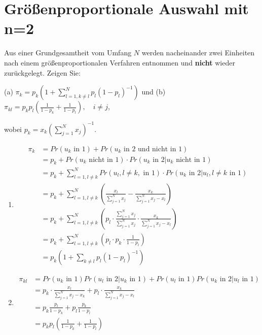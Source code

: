 \documentclass{article}
\begin{document}
\section{Größenproportionale Auswahl mit n=2}
Aus einer Grundgesamtheit vom Umfang $N$ werden nacheinander zwei Einheiten nach einem größenproportionalen Verfahren entnommen
und \textbf{nicht} wieder zurückgelegt. Zeigen Sie:
\begin{center}
(a) $\pi_k = p_k \left(1 + \sum_{l=1,k\neq l}^N p_l (1 - p_l)^{-1}  \right)$ und 
(b) $\pi_{kl} = p_k p_l  \left(\frac{1}{1 - p_k} + \frac{1}{1 - p_l}  \right), \quad i \neq j$,\end{center} wobei $p_k = x_k \left(\sum_{j=1}^N x_j \right)^{-1}$.
\begin{solution}
\begin{enumerate}
	\item \begin{align*}
	\pi_k &=Pr(u_k \text{ in } 1) + Pr(u_k \text{ in 2 und nicht in }1) \\
	&= p_k +Pr(u_k \text{ nicht in 1})\cdot Pr(u_k \text{ in 2}|u_k \text{ nicht in 1})\\
	&=p_k + \sum_{l=1,l \neq k}^N Pr(u_l, l\neq k, \text{ in 1}) \cdot Pr(u_k \text{ in 2}|u_l, l \neq k \text{ in 1})\\
	&=p_k + \sum_{l=1,l\neq k}^N\left(\frac{x_l}{\sum_{j=1}^N x_j} - \frac{x_k}{\sum_{j=1}^N x_j-x_l}\right)\\
	&=p_k +\sum_{l=1,l\neq k}^N\left(p_l \cdot \frac{\sum_{j=1}^N x_j}{\sum_{j=1}^N x_j} \cdot \frac{x_k}{\sum_{j=1}^N x_j-x_l}\right)\\
	&=p_k +\sum_{l=1,l\neq k}^N \left(p_l \cdot p_k\cdot  \frac{1}{1-p_l}\right)\\
	&= p_k \left(1 + \sum_{k\neq l} p_l (1 - p_l)^{-1}  \right)
	\end{align*}
	\item \begin{align*}
	\pi_{kl} &= Pr(u_k \text{ in 1})Pr(u_l \text{ in 2}|u_k \text{ in 1}) + Pr(u_l \text{ in 1})Pr(u_k \text{ in 2}|u_l \text{ in 1})\\
	& = p_k\cdot \frac{x_l}{\sum_{j=1}^N x_j -x_k} + p_l\cdot \frac{x_k}{\sum_{j=1}^N x_j -x_l}\\
	&= p_k \frac{p_l}{1-p_k} + p_l \frac{p_k}{1-p_l}\\
	&= p_k p_l (\frac{1}{1-p_k}+\frac{1}{1-p_l})
	\end{align*}
\end{enumerate}
\end{solution}
\end{document}
